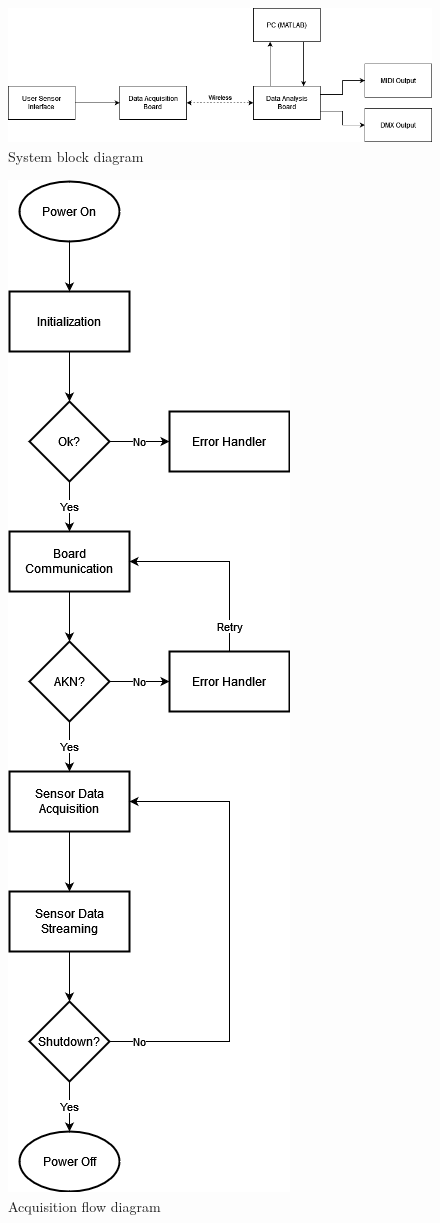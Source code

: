 \begin{figure}[!ht]
    \caption{System block diagram}\label{fig:block}
    \centering
    \includegraphics[width=1\columnwidth]{chapters/project_plan/figures/System_Block_Diagram}
\end{figure}

\begin{figure}[!ht]
    \caption{Acquisition flow diagram}\label{fig:acquisition}
    \centering
    \includegraphics[scale=0.40]{chapters/project_plan/figures/Acquisition_Flow_Diagram}

\end{figure}
